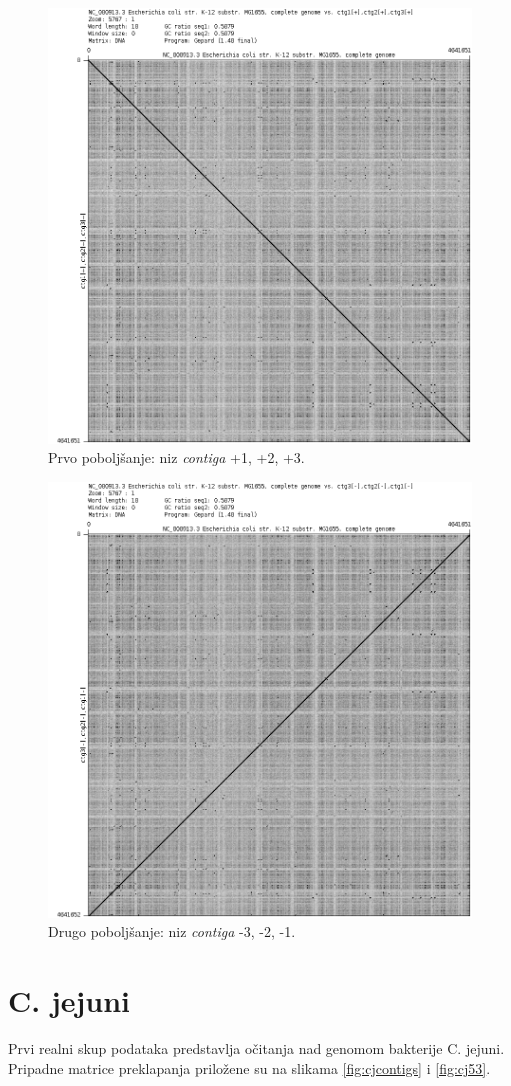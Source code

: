 \documentclass[times, utf8, seminar, numeric]{fer}
\begin{document}
\begin{figure}[h]
	\centering
	\centerline{\includegraphics[width=0.7\linewidth]{img/ec_1_2_3}}
	\caption{Prvo poboljšanje: niz \textit{contiga} +1, +2, +3.}
	\label{fig:ec123}
\end{figure}

\begin{figure}[h]
	\centering
	\centerline{\includegraphics[width=0.7\linewidth]{img/ec_3_2_1_neg}}
	\caption{Drugo poboljšanje: niz \textit{contiga} -3, -2, -1.}
	\label{fig:ec321neg}
\end{figure}


\section{C. jejuni}
Prvi realni skup podataka predstavlja očitanja nad genomom bakterije C. jejuni. Pripadne matrice preklapanja priložene su na slikama \ref{fig:cjcontigs} i \ref{fig:cj53}.
\end{document}
